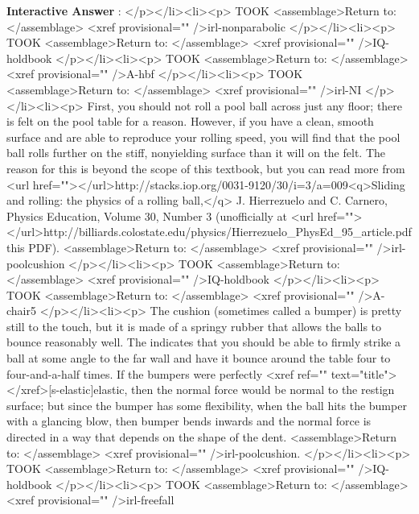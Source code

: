 \documentclass[11pt,letter,openany,makeidx]{book}
\newcounter{AtIQ}
\renewcommand{\theAtIQ}{Answer \arabic{AtIQ}}
\newenvironment{AIQ}{\begin{list}{\textbf{Interactive \theAtIQ}:}{\usecounter{AtIQ} \leftmargin 12pt}}{\end{list}}
\begin{document}
\begin{AIQ}
</p></li><li><p>\label{A-pitches.top} TOOK <assemblage>Return to: </assemblage> <xref provisional="" />{irl-nonparabolic}
</p></li><li><p>\label{A-landedY} TOOK  <assemblage>Return to: </assemblage> <xref provisional="" />{IQ-holdbook}
</p></li><li><p>\label{A-gravity}  TOOK <assemblage>Return to: </assemblage> <xref provisional="" />{A-hbf}
</p></li><li><p>\label{A-chair8} TOOK <assemblage>Return to: </assemblage> <xref provisional="" />{irl-NI}
</p></li><li><p>\label{A-pool.roll} First, you should not roll a pool ball across just any floor; there is felt on the pool table for a reason.  However, if you have a clean, smooth surface and are able to reproduce your rolling speed, you will find that the pool ball rolls further on the stiff, nonyielding surface than it will on the felt.  The reason for this is beyond the scope of this textbook, but you can read more from <url href=""></url>{http://stacks.iop.org/0031-9120/30/i=3/a=009}{<q>Sliding and rolling: the physics of a rolling ball,</q> J. Hierrezuelo and C. Carnero, Physics Education, Volume 30, Number 3} (unofficially at <url href=""></url>{http://billiards.colostate.edu/physics/Hierrezuelo_PhysEd_95_article.pdf}{this PDF}). <assemblage>Return to: </assemblage> <xref provisional="" />{irl-poolcushion}
</p></li><li><p>\label{A-landedN} TOOK <assemblage>Return to: </assemblage> <xref provisional="" />{IQ-holdbook}
</p></li><li><p>\label{A-FT} TOOK  <assemblage>Return to: </assemblage> <xref provisional="" />{A-chair5}
</p></li><li><p>\label{A-pool.bumper} The cushion (sometimes called a bumper) is pretty still to the touch, but it is made of a springy rubber that allows the balls to bounce reasonably well.  The  indicates that you should be able to firmly strike a ball at some angle to the far wall and have it bounce around the table four to four-and-a-half times.  If the bumpers were perfectly <xref ref="" text="title"></xref>[s-elastic]{elastic}, then the normal force would be normal to the restign surface; but since the bumper has some flexibility, when the ball hits the bumper with a glancing blow, then bumper bends inwards and the normal force is directed in a way that depends on the shape of the dent.  <assemblage>Return to: </assemblage> <xref provisional="" />{irl-poolcushion}.
</p></li><li><p>\label{A-zero} TOOK <assemblage>Return to: </assemblage> <xref provisional="" />{IQ-holdbook}
</p></li><li><p>\label{A-firstfall} TOOK  <assemblage>Return to: </assemblage> <xref provisional="" />{irl-freefall}

\end{AIQ}
\end{document}
